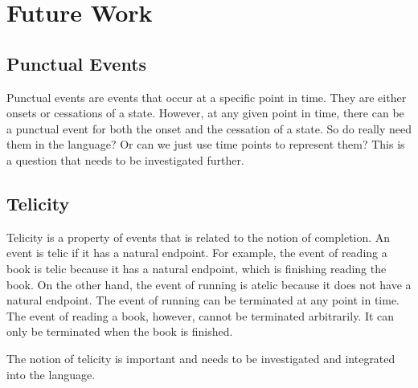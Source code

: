 \chapter*{Future Work}

\section{Punctual Events}
\label{sec:punctual_events}

Punctual events are events that occur at a specific point in time. They are
either onsets or cessations of a state. However, at any given point in time,
there can be a punctual event for both the onset and the cessation of a state.
So do really need them in the language? Or can we just use time points to
represent them? This is a question that needs to be investigated further.

\section{Telicity}
\label{sec:telecity}

Telicity is a property of events that is related to the notion of completion.
An event is telic if it has a natural endpoint. For example, the event of
reading a book is telic because it has a natural endpoint, which is finishing
reading the book. On the other hand, the event of running is atelic because it
does not have a natural endpoint. The event of running can be terminated at any
point in time. The event of reading a book, however, cannot be terminated
arbitrarily. It can only be terminated when the book is finished.

The notion of telicity is important and needs to be investigated and integrated
into the language.